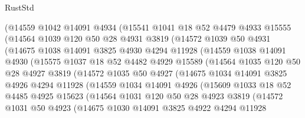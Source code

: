 \begin{lexlean}{RustStd}
\begin{coremodule}
        (@14559
          @1042
          @14091
          @4934
          (@15541
            @1041
            @18
            @52
            @4479
            @4933
            @15555
            (@14564
              @1039
              @120
              @50
              @28
              @4931
              @3819
              (@14572
                @1039
                @50
                @4931
                (@14675
                  @1038
                  @14091
                  @3825
                  @4930
                  @4294
                  @11928
                  (@14559
                    @1038
                    @14091
                    @4930
                    (@15575
                      @1037
                      @18
                      @52
                      @4482
                      @4929
                      @15589
                      (@14564
                        @1035
                        @120
                        @50
                        @28
                        @4927
                        @3819
                        (@14572
                          @1035
                          @50
                          @4927
                          (@14675
                            @1034
                            @14091
                            @3825
                            @4926
                            @4294
                            @11928
                            (@14559
                              @1034
                              @14091
                              @4926
                              (@15609
                                @1033
                                @18
                                @52
                                @4485
                                @4925
                                @15623
                                (@14564
                                  @1031
                                  @120
                                  @50
                                  @28
                                  @4923
                                  @3819
                                  (@14572
                                    @1031
                                    @50
                                    @4923
                                    (@14675
                                      @1030
                                      @14091
                                      @3825
                                      @4922
                                      @4294
                                      @11928

\end{coremodule}
\end{lexlean}
